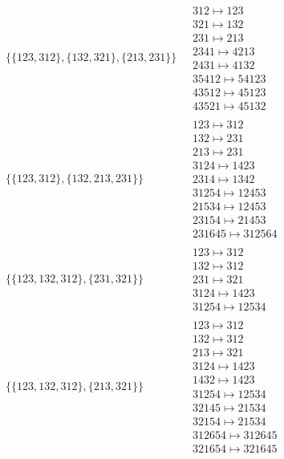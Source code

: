 \begin{scriptsize}
\begin{align}
\begin{matrix}
\end{matrix}
\\
\{\{123, 312\}, \{132, 321\}, \{213, 231\}\}
\ 
&
\begin{matrix}
312 \mapsto 123\\321 \mapsto 132\\231 \mapsto 213\\2341 \mapsto 4213\\2431 \mapsto 4132\\35412 \mapsto 54123\\43512 \mapsto 45123\\43521 \mapsto 45132
\end{matrix}
\\
\{\{123, 312\}, \{132, 213, 231\}\}
\ 
&
\begin{matrix}
123 \mapsto 312\\132 \mapsto 231\\213 \mapsto 231\\3124 \mapsto 1423\\2314 \mapsto 1342\\31254 \mapsto 12453\\21534 \mapsto 12453\\23154 \mapsto 21453\\231645 \mapsto 312564
\end{matrix}
\\
\{\{123, 132, 312\}, \{231, 321\}\}
\ 
&
\begin{matrix}
123 \mapsto 312\\132 \mapsto 312\\231 \mapsto 321\\3124 \mapsto 1423\\31254 \mapsto 12534
\end{matrix}
\\
\{\{123, 132, 312\}, \{213, 321\}\}
\ 
&
\begin{matrix}
123 \mapsto 312\\132 \mapsto 312\\213 \mapsto 321\\3124 \mapsto 1423\\1432 \mapsto 1423\\31254 \mapsto 12534\\32145 \mapsto 21534\\32154 \mapsto 21534\\312654 \mapsto 312645\\321654 \mapsto 321645
\end{matrix}
\\

\end{align}
\end{scriptsize}
